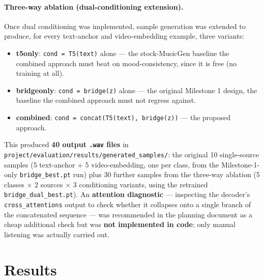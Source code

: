 \documentclass[11pt]{article}
\begin{document}
\paragraph{Three-way ablation (dual-conditioning extension).} Once dual conditioning was
implemented, sample generation was extended to produce, for every text-anchor and video-embedding
example, three variants:
\begin{itemize}
  \item \textbf{t5only}: \texttt{cond = T5(text)} alone --- the stock-MusicGen baseline the
  combined approach must beat on mood-consistency, since it is free (no training at all).
  \item \textbf{bridgeonly}: \texttt{cond = bridge(z)} alone --- the original Milestone 1 design,
  the baseline the combined approach must not regress against.
  \item \textbf{combined}: \texttt{cond = concat(T5(text), bridge(z))} --- the proposed approach.
\end{itemize}
This produced \textbf{40 output \texttt{.wav} files} in
\texttt{project/evaluation/results/generated\_samples/}: the original 10 single-source samples
(5 text-anchor + 5 video-embedding, one per class, from the Milestone-1-only
\texttt{bridge\_best.pt} run) plus 30 further samples from the three-way ablation (5 classes
$\times$ 2 sources $\times$ 3 conditioning variants, using the retrained
\texttt{bridge\_dual\_best.pt}). An \textbf{attention diagnostic} --- inspecting the decoder's
\texttt{cross\_attentions} output to check whether it collapses onto a single branch of the
concatenated sequence --- was recommended in the planning document as a cheap additional check
but was \textbf{not implemented in code}; only manual listening was actually carried out.

\section{Results}
\label{sec:results}
\end{document}

